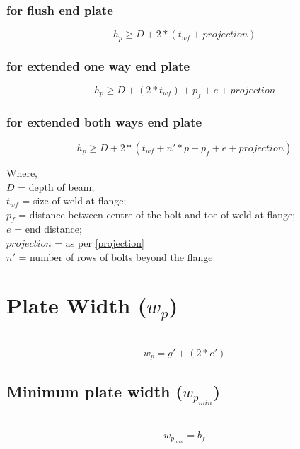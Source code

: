 \documentclass[11.5pt,a4paper,oneside]{report}
\begin{document}
\begin{Form}
	\subsubsection{for flush end plate}
		\begin{equation}
			h_p \ge D + 2 * (t_{wf} + projection)
		\end{equation}
	
	\subsubsection{for extended one way end plate}
	\begin{equation}
	h_p \ge D + (2 * t_{wf}) + p_f + e + projection
	\end{equation}
	
	\subsubsection{for extended both ways end plate}
	\begin{equation}
	h_p \ge D + 2 * (t_{wf} + n'*p + p_f + e + projection)
	\end{equation}
				
		Where, \\
	\indent $D$ = depth of beam; \\
	\indent $t_{wf}$ = size of weld at flange; \\
	\indent $p_f$ =  distance between centre of the bolt and toe of weld at flange;\\
	\indent $e$ = end distance; \\
	\indent $projection$ = as per \ref{projection}\\
	\indent $n'$ = number of rows of bolts beyond the flange

\section{Plate Width (\boldmath $w_p$)}
\qquad {} \\
	\begin{equation}
		w_p = g' + (2 * e')
	\end{equation}

\subsection{Minimum plate width (\boldmath $w_{p_{min}}$)} 
\qquad {} \\
	\begin{equation}
		w_{p_{min}} = b_f
	\end{equation}


\end{Form}
\end{document}
